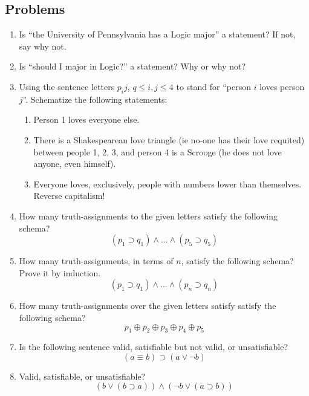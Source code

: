\newpage
\begin{mdframed}[linewidth=1]
\section*{Problems}
\begin{enumerate}
    \item Is ``the University of Pennsylvania has a Logic major'' a statement? If not, say why not. 

    \item Is ``should I major in Logic?'' a statement? Why or why not?

    \item Using the sentence letters $p_ij$, $q \leq i, j \leq 4$ to stand for ``person $i$ loves person $j$''. Schematize the following statements:
    \begin{enumerate}
        \item Person 1 loves everyone else.

        \item There is a Shakespearean love triangle (ie no-one has their love requited) between people 1, 2, 3, and person 4 is a Scrooge (he does not love anyone, even himself). 

        \item Everyone loves, exclusively, people with numbers lower than themselves. Reverse capitalism! 
    \end{enumerate}

    \item How many truth-assignments to the given letters satisfy the following schema?
    \[
        (p_1 \supset q_1) \land ... \land (p_5 \supset q_5)
    \]

    \item How many truth-assignments, in terms of $n$, satisfy the following schema? Prove it by induction. 
    \[
      (p_1 \supset q_1) \land ... \land (p_n \supset q_n)  
    \]

    \item How many truth-assignments over the given letters satisfy satisfy the following schema?
    \[
        p_1 \oplus p_2 \oplus p_3 \oplus p_4 \oplus p_5
    \]

     \item Is the following sentence valid, satisfiable but not valid, or unsatisfiable?
    \[
        (a \equiv b) \supset (a \vee \lnot b)
    \]

    \item Valid, satisfiable, or unsatisfiable?
    \[
        (b \vee (b \supset a)) \land (\lnot b \vee (a \supset b))
    \]


\end{enumerate}
\end{mdframed}
